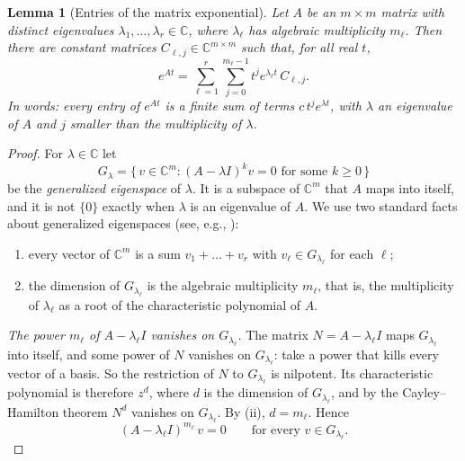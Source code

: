 \documentclass[11pt]{article}
\newtheorem{lemma}[theorem]{Lemma}
\theoremstyle{definition}
\theoremstyle{remark}
\newcommand{\C}{\mathbb{C}}
\begin{document}
\begin{lemma}[Entries of the matrix exponential]\label{lem:modes}
Let $A$ be an $m \times m$ matrix with distinct eigenvalues $\lambda_1, \dots, \lambda_r \in \C$,
where $\lambda_\ell$ has algebraic multiplicity $m_\ell$. Then there are constant matrices
$C_{\ell,j} \in \C^{m \times m}$ such that, for all real $t$,
\begin{equation}\label{eq:modes}
  e^{At} = \sum_{\ell=1}^{r} \sum_{j=0}^{m_\ell - 1} t^{j} e^{\lambda_\ell t}\, C_{\ell,j} .
\end{equation}
In words: every entry of $e^{At}$ is a finite sum of terms $c\, t^{j} e^{\lambda t}$, with
$\lambda$ an eigenvalue of $A$ and $j$ smaller than the multiplicity of $\lambda$.
\end{lemma}

\begin{proof}
For $\lambda \in \C$ let
\[
  G_\lambda = \{\, v \in \C^{m} : (A - \lambda I)^{k} v = 0 \text{ for some } k \ge 0 \,\}
\]
be the \emph{generalized eigenspace} of $\lambda$. It is a subspace of $\C^{m}$ that $A$ maps into
itself, and it is not $\{0\}$ exactly when $\lambda$ is an eigenvalue of $A$. We use two standard
facts about generalized eigenspaces
(see, e.g., \cite[Chapter~8]{Axler}):
\begin{enumerate}[label=\textup{(\roman*)}]
  \item every vector of $\C^{m}$ is a sum $v_1 + \dots + v_r$ with $v_\ell \in G_{\lambda_\ell}$
        for each $\ell$;
  \item the dimension of $G_{\lambda_\ell}$ is the algebraic multiplicity $m_\ell$, that is, the
        multiplicity of $\lambda_\ell$ as a root of the characteristic polynomial of $A$.
\end{enumerate}

\emph{The power $m_\ell$ of $A - \lambda_\ell I$ vanishes on $G_{\lambda_\ell}$.} The matrix
$N = A - \lambda_\ell I$ maps $G_{\lambda_\ell}$ into itself, and some power of $N$ vanishes on
$G_{\lambda_\ell}$: take a power that kills every vector of a basis. So the restriction of $N$ to
$G_{\lambda_\ell}$ is nilpotent. Its characteristic polynomial is therefore $z^{d}$, where $d$ is
the dimension of $G_{\lambda_\ell}$, and by the Cayley--Hamilton theorem $N^{d}$ vanishes on
$G_{\lambda_\ell}$. By (ii), $d = m_\ell$. Hence
\begin{equation}\tag{$\ast$}\label{eq:nilpotent}
  (A - \lambda_\ell I)^{m_\ell}\, v = 0 \qquad \text{for every } v \in G_{\lambda_\ell} .
\end{equation}


\end{proof}
\end{document}

